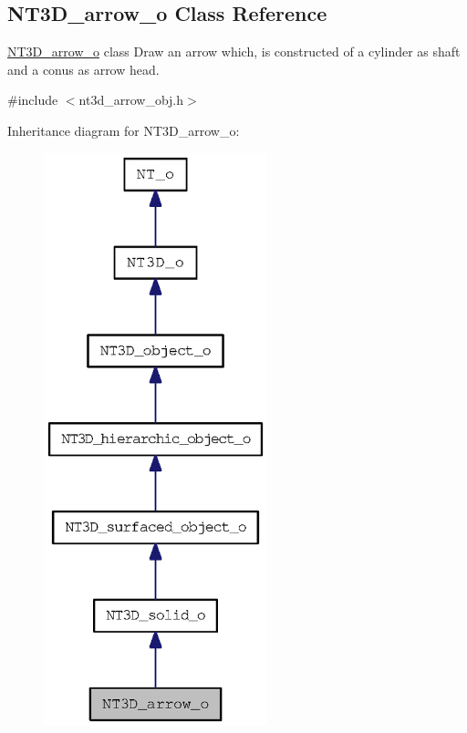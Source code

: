 \subsection{NT3D\_\-arrow\_\-o Class Reference}
\label{class_n_t3_d__arrow__o}


\hyperlink{class_n_t3_d__arrow__o}{NT3D\_\-arrow\_\-o} class Draw an arrow which, is constructed of a cylinder as shaft and a conus as arrow head.  




{\ttfamily \#include $<$nt3d\_\-arrow\_\-obj.h$>$}



Inheritance diagram for NT3D\_\-arrow\_\-o:
\nopagebreak
\begin{figure}[H]
\begin{center}
\leavevmode
\includegraphics[width=184pt]{class_n_t3_d__arrow__o__inherit__graph}
\end{center}
\end{figure}


